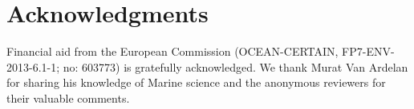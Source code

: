 \documentclass[11pt]{article}
\begin{document}
%

\section*{Acknowledgments}

Financial aid from the European Commission (OCEAN-CERTAIN, FP7-ENV-2013-6.1-1; no: 603773) is gratefully acknowledged. 
We thank Murat Van Ardelan for sharing his knowledge of Marine science and the anonymous reviewers for their valuable comments. 



\FloatBarrier 
\pagebreak



\end{document}
